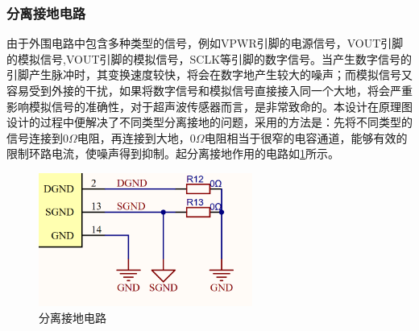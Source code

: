     \subsubsection{分离接地电路}
    由于外围电路中包含多种类型的信号，例如VPWR引脚的电源信号，VOUT引脚的模拟信号,VOUT引脚的模拟信号，SCLK等引脚的数字信号。当产生数字信号的引脚产生脉冲时，其变换速度较快，将会在数字地产生较大的噪声；而模拟信号又容易受到外接的干扰，如果将数字信号和模拟信号直接接入同一个大地，将会严重影响模拟信号的准确性，对于超声波传感器而言，是非常致命的。本设计在原理图设计的过程中便解决了不同类型分离接地的问题，采用的方法是：先将不同类型的信号连接到0$\Omega$电阻，再连接到大地，0$\Omega$电阻相当于很窄的电容通道，能够有效的限制环路电流，使噪声得到抑制。起分离接地作用的电路如\ref{分离接地电路}所示。
     \begin{figure}[!h]
        \centering
        \includegraphics[width=7cm]{figure/seperate ground.png}
        \caption{分离接地电路}
        \label{分离接地电路}
    \end{figure}
